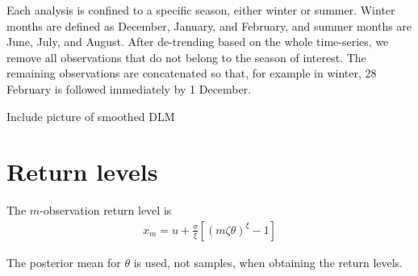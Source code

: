 \documentclass[12pt]{article}
\begin{document}
Each analysis is confined to a specific season, either winter or summer. Winter months are defined as December, January, and February, and summer months are June, July, and August. After de-trending based on the whole time-series, we remove all observations that do not belong to the season of interest. The remaining observations are concatenated so that, for example in winter, 28 February is followed immediately by 1 December.

Include picture of smoothed DLM


\section{Return levels}
\label{return}

The $m$-observation return level is
\begin{align}
x_m = u +\frac{\sigma}{\xi}\left[\left(m\zeta\theta\right)^\xi-1\right] \label{rl}
\end{align}

The posterior mean for $\theta$ is used, not samples, when obtaining the return levels.
\end{document}
